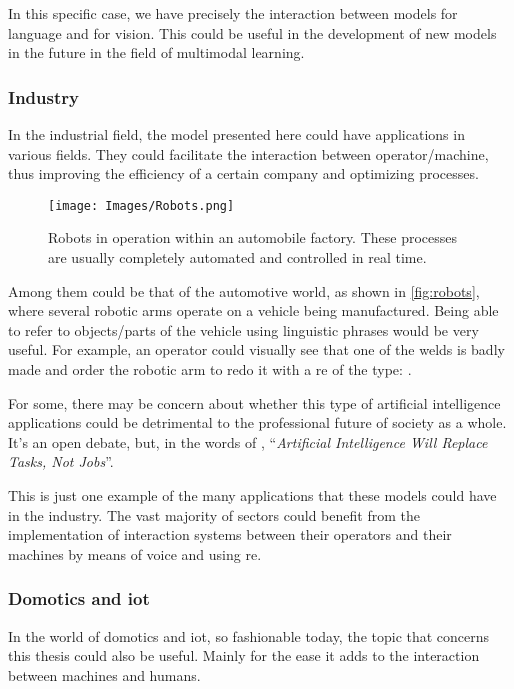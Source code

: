 In this specific case, we have precisely the interaction between models for
language and for vision. This could be useful in the development of new models
in the future in the field of multimodal learning.

\subsubsection{Industry}
In the industrial field, the model presented here could have applications in
various fields. They could facilitate the interaction between operator/machine,
thus improving the efficiency of a certain company and optimizing processes.

\begin{figure}[htb]
  \centering
  \texttt{[image: Images/Robots.png]}
  \caption[Robots in automobile factory]{Robots in operation within an
    automobile factory. These processes are usually completely automated and
    controlled in real time.}
  \label{fig:robots}
\end{figure}

Among them could be that of the automotive world, as shown in
\vref{fig:robots}, where several robotic arms operate on a vehicle being
manufactured. Being able to refer to objects/parts of the vehicle using
linguistic phrases would be very useful. For example, an operator could
visually see that one of the welds is badly made and order the robotic arm to
redo it with a \gls{re} of the type: .

\begin{remarkBox}
  For some, there may be concern about whether this type of artificial
  intelligence applications could be detrimental to the professional future of
  society as a whole. It's an open debate, but, in the words of
  \citeauthor*{contributor18:artif_intel_will_replac_tasks_not_jobs}
  \cite{contributor18:artif_intel_will_replac_tasks_not_jobs},
  ``\textit{Artificial Intelligence Will Replace Tasks, Not Jobs}''.
\end{remarkBox}

This is just one example of the many applications that these models could have
in the industry. The vast majority of sectors could benefit from the
implementation of interaction systems between their operators and their
machines by means of voice and using \gls{re}.

\subsubsection{Domotics and \acs*{iot}}
In the world of domotics and \gls{iot}, so fashionable today, the topic that
concerns this thesis could also be useful. Mainly for the ease it adds to the
interaction between machines and humans.


